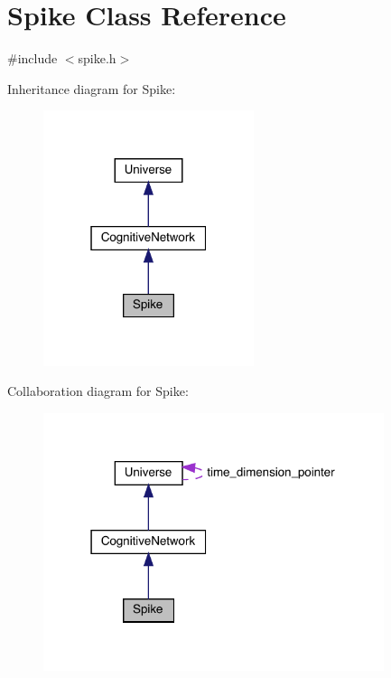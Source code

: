 \hypertarget{class_spike}{}\section{Spike Class Reference}
\label{class_spike}


{\ttfamily \#include $<$spike.\+h$>$}



Inheritance diagram for Spike\+:\nopagebreak
\begin{figure}[H]
\begin{center}
\leavevmode
\includegraphics[width=175pt]{class_spike__inherit__graph}
\end{center}
\end{figure}


Collaboration diagram for Spike\+:\nopagebreak
\begin{figure}[H]
\begin{center}
\leavevmode
\includegraphics[width=283pt]{class_spike__coll__graph}
\end{center}
\end{figure}
